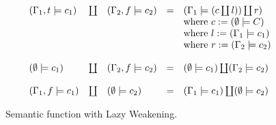 \documentclass[conference]{IEEEtran}
\begin{document}
\begin{figure}
\begin{equation*}
\begin{array}{l l l l l}
            \\
            (\Gamma_1,t \models c_1) & \coprod & (\Gamma_2,f \models c_2) & = & (\Gamma_1 \models (c \coprod l)) \coprod r)              \\
                                     &         &                          &   & \text{where } c := (\emptyset \models C )                \\
                                     &         &                          &   & \text{where } l := (\Gamma_1 \models c_1 )               \\
                                     &         &                          &   & \text{where } r := (\Gamma_2 \models c_2 )               \\
            \\
            (\emptyset \models c_1)  & \coprod & (\Gamma_2,f \models c_2) & = & (\emptyset \models c_1) \coprod (\Gamma_2 \models c_2)   \\
            \\
            (\Gamma_1,f \models c_1) & \coprod & (\emptyset \models c_2)  & = & (\Gamma_1 \models c_1) \coprod (\emptyset \models c_2)   \\
        \end{array}
    \end{equation*}
    \centering
    \caption{Semantic function with Lazy Weakening.}
    \label{fig:lazy-sem}
\end{figure}
\end{document}
